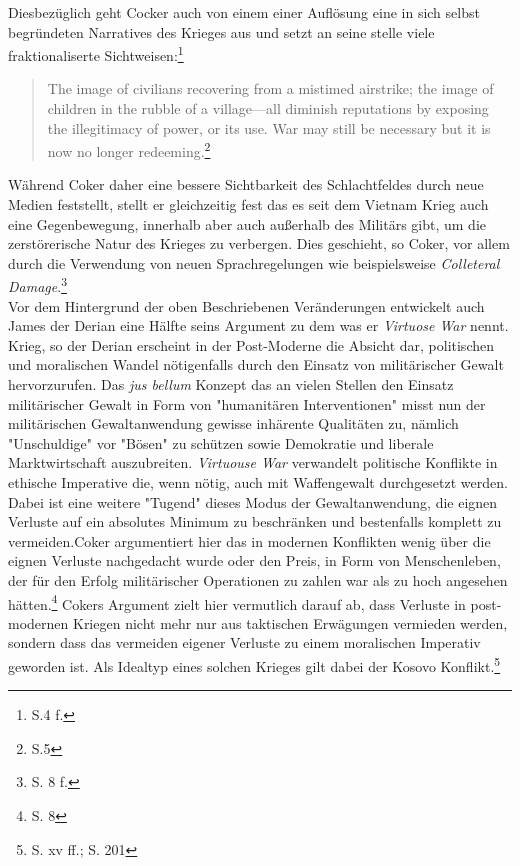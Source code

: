 \documentclass[11pt,a4paper,oneside,numbers=noenddot,bibliography=totocnumbered,DIV=13]{scrartcl}
\begin{document}
Diesbezüglich geht Cocker auch von einem einer Auflösung eine in sich selbst begründeten Narratives des Krieges aus und setzt an seine stelle viele fraktionaliserte Sichtweisen:\footnote{\cite{coker_collision_2012} S.4 f.} 
\begin{quote}
The image of civilians recovering from a mistimed airstrike; the image of children in the
rubble of a village—all diminish reputations by exposing the illegitimacy of power, or its use. War may still be
necessary but it is now no longer redeeming.\footnote{\cite{coker_collision_2012}S.5} 
\end{quote}  
Während Coker daher eine bessere Sichtbarkeit des Schlachtfeldes durch neue Medien feststellt, stellt er gleichzeitig fest das es seit dem Vietnam Krieg auch eine Gegenbewegung, innerhalb aber auch außerhalb des Militärs gibt, um die zerstörerische Natur des Krieges zu verbergen. Dies geschieht, so Coker, vor allem durch die Verwendung von neuen Sprachregelungen wie beispielsweise \textit{Colleteral Damage}.\footnote{\cite{coker_postmodern_2008}S. 8 f.}\\  
Vor dem Hintergrund der oben Beschriebenen Veränderungen entwickelt auch James der Derian eine Hälfte seins Argument zu dem was er \textit{Virtuose War} nennt. Krieg, so der Derian erscheint in der Post-Moderne die Absicht dar, politischen und moralischen Wandel nötigenfalls durch den Einsatz von militärischer Gewalt hervorzurufen. Das \textit{jus bellum} Konzept das an vielen Stellen den Einsatz militärischer Gewalt in Form von "humanitären Interventionen" misst nun der militärischen Gewaltanwendung gewisse inhärente Qualitäten zu, nämlich "Unschuldige" vor "Bösen" zu schützen sowie Demokratie und liberale Marktwirtschaft auszubreiten. \textit{Virtuouse War} verwandelt politische Konflikte in ethische Imperative die, wenn nötig, auch mit Waffengewalt durchgesetzt werden. Dabei ist eine weitere "Tugend" dieses Modus der Gewaltanwendung, die eignen Verluste auf ein absolutes Minimum zu beschränken und bestenfalls komplett zu vermeiden.Coker argumentiert hier das in modernen Konflikten wenig über die eignen Verluste nachgedacht wurde oder den Preis, in Form von Menschenleben, der für den Erfolg militärischer Operationen zu zahlen war als zu hoch angesehen hätten.\footnote{\cite{coker_postmodern_2008}S. 8} 
Cokers Argument zielt hier vermutlich darauf ab, dass Verluste in post-modernen Kriegen nicht mehr nur aus taktischen Erwägungen vermieden werden, sondern dass das vermeiden eigener Verluste zu einem moralischen Imperativ geworden ist. Als Idealtyp eines solchen Krieges gilt dabei der Kosovo Konflikt.\footnote{\cite{DerDerian2001} S. xv ff.; S. 201}\\
\end{document}

